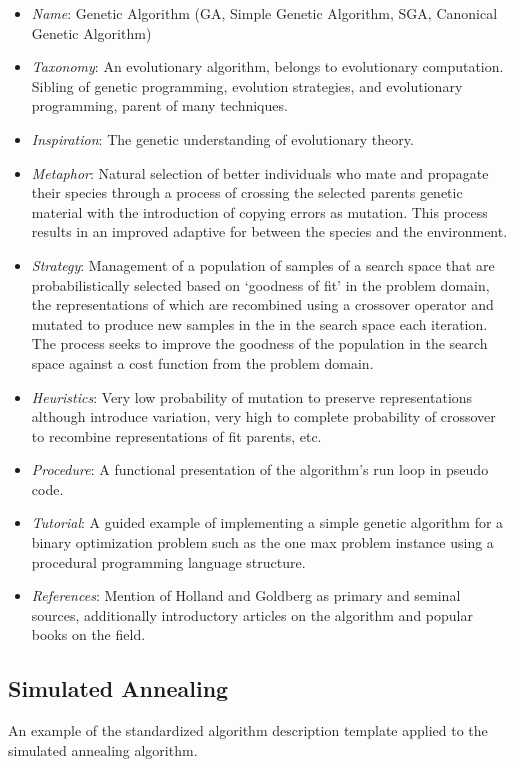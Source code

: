 \documentclass[a4paper, 11pt]{article}
\begin{document}
\begin{itemize}
	\item \emph{Name}: Genetic Algorithm (GA, Simple Genetic Algorithm, SGA, Canonical Genetic Algorithm)
	\item \emph{Taxonomy}: An evolutionary algorithm, belongs to evolutionary computation. Sibling of genetic programming, evolution strategies, and evolutionary programming, parent of many techniques.
	\item \emph{Inspiration}: The genetic understanding of evolutionary theory. 
	\item \emph{Metaphor}: Natural selection of better individuals who mate and propagate their species through a process of crossing the selected parents genetic material with the introduction of copying errors as mutation. This process results in an improved adaptive for between the species and the environment.
	\item \emph{Strategy}: Management of a population of samples of a search space that are probabilistically selected based on `goodness of fit' in the problem domain, the representations of which are recombined using a crossover operator and mutated to produce new samples in the in the search space each iteration. The process seeks to improve the goodness of the population in the search space against a cost function from the problem domain.
	\item \emph{Heuristics}: Very low probability of mutation to preserve representations although introduce variation, very high to complete probability of crossover to recombine representations of fit parents, etc.
	\item \emph{Procedure}: A functional presentation of the algorithm's run loop in pseudo code.
	\item \emph{Tutorial}: A guided example of implementing a simple genetic algorithm for a binary optimization problem such as the one max problem instance using a procedural programming language structure.
	\item \emph{References}: Mention of Holland and Goldberg as primary and seminal sources, additionally introductory articles on the algorithm and popular books on the field.
\end{itemize}

\subsection{Simulated Annealing}
An example of the standardized algorithm description template applied to the simulated annealing algorithm.
\end{document}
